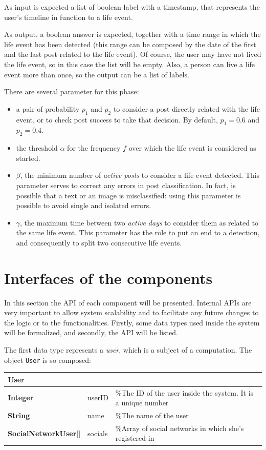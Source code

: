As input is expected a list of boolean label with a timestamp, that represents the user's timeline in function to a life event.

As output, a boolean answer is expected, together with a time range in which the life event has been detected (this range can be composed by the date of the first and the last post related to the life event). Of course, the user may have not lived the life event, so in this case the list will be empty. Also, a person can live a life event more than once, so the output can be a list of labels.

There are several parameter for this phase: 
\begin{itemize}
\item a pair of probability $p_1$ and $p_2$ to consider a post directly related with the life event, or to check post success to take that decision. By default, $p_1 = 0.6$ and $p_2 = 0.4$.
\item the threshold $\alpha$ for the frequency $f$ over which the life event is considered as started.
\item $\beta$, the minimum number of \textit{active posts} to consider a life event detected. This parameter serves to correct any errors in post classification. In fact, is possible that a text or an image is misclassified: using this parameter is possible to avoid single and isolated errors.
\item $\gamma$, the maximum time between two \textit{active days} to consider them as related to the same life event. This parameter has the role to put an end to a detection, and consequently to split two consecutive life events.
\end{itemize}

\section{Interfaces of the components}
\label{sec:apis}
In this section the API of each component will be presented. Internal APIs are very important to allow system scalability and to facilitate any future changes to the logic or to the functionalities. Firstly, some data types used inside the system will be formalized, and secondly, the API will be listed.

The first data type represents a \textit{user}, which is a subject of a computation. The object \texttt{User} is so composed:

\begin{center}
\label{tab:user}
\begin{tabular}{lll}
\hline
User & & \\
\hline
\textbf{Integer} & userID & \%The ID of the user inside the system. It is a unique number \\
\textbf{String} & name & \%The name of the user \\
\textbf{SocialNetworkUser}[] & socials & \%Array of social networks in which she's registered in \\
\hline
\end{tabular}
\end{center}

